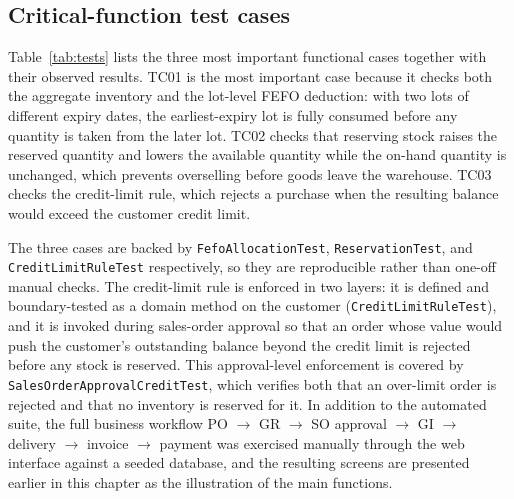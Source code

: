 \subsection{Critical-function test cases}
Table~\ref{tab:tests} lists the three most important functional cases together
with their observed results. TC01 is the most important case because it checks
both the aggregate inventory and the lot-level FEFO deduction: with two lots of
different expiry dates, the earliest-expiry lot is fully consumed before any
quantity is taken from the later lot. TC02 checks that reserving stock raises the
reserved quantity and lowers the available quantity while the on-hand quantity is
unchanged, which prevents overselling before goods leave the warehouse. TC03
checks the credit-limit rule, which rejects a purchase when the resulting balance
would exceed the customer credit limit.

\begin{table}[H]\centering
\caption{Critical-function test cases and results}
\label{tab:tests}
\end{table}

The three cases are backed by \texttt{FefoAllocationTest}, \texttt{ReservationTest},
and \texttt{CreditLimitRuleTest} respectively, so they are reproducible rather than
one-off manual checks. The credit-limit rule is enforced in two layers: it is
defined and boundary-tested as a domain method on the customer
(\texttt{CreditLimitRuleTest}), and it is invoked during sales-order approval so
that an order whose value would push the customer's outstanding balance beyond the
credit limit is rejected before any stock is reserved. This approval-level
enforcement is covered by \texttt{SalesOrderApprovalCreditTest}, which verifies
both that an over-limit order is rejected and that no inventory is reserved for it.
In
addition to the automated suite, the full business workflow PO $\to$ GR $\to$ SO
approval $\to$ GI $\to$ delivery $\to$ invoice $\to$ payment was exercised
manually through the web interface against a seeded database, and the resulting
screens are presented earlier in this chapter as the illustration of the main
functions.

